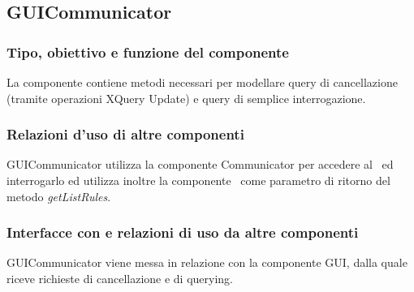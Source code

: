 \subsection{GUICommunicator}
\subsubsection{Tipo, obiettivo e funzione del componente}
La componente contiene metodi necessari per modellare query di cancellazione (tramite operazioni XQuery Update) e query di semplice interrogazione.
\subsubsection{Relazioni d'uso di altre componenti}
GUICommunicator utilizza la componente Communicator per accedere al \rp\ ed interrogarlo ed utilizza inoltre la componente \BR\ come parametro di ritorno del metodo \textit{getListRules}.
\subsubsection{Interfacce con e relazioni di uso da altre componenti}
GUICommunicator viene messa in relazione con la componente GUI, dalla quale riceve richieste di cancellazione e di querying.
